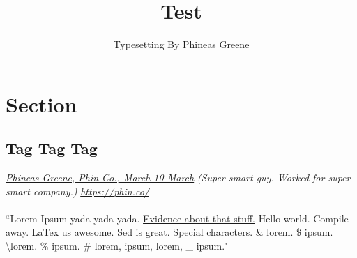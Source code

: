 \documentclass{article}
\author{Typesetting By Phineas Greene}
\title{Test}
\begin{document}
\maketitle
\tableofcontents
\newpage
{}

\section{Section}
\subsection{Tag Tag Tag}
\textit{\ul{Phineas Greene, Phin Co., March 10 March}}
\textit{(Super smart guy. Worked for super smart company.)}
\textit{\url{https://phin.co/}}
\paragraph{}``Lorem Ipsum yada yada yada. \ul{Evidence about that stuff.} Hello world. Compile away. LaTex us awesome. Sed is great. Special characters. \& lorem. \$ ipsum. \textbackslash  lorem. \% ipsum. \# lorem, { ipsum, } lorem, \_ ipsum."
\end{document}
